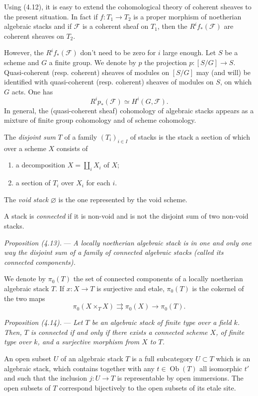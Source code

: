 \documentclass[10pt]{article}
\begin{document}
Using (4.12), it is easy to extend the cohomological theory of coherent sheaves to the present situation. In fact if $f:T_1\to T_2$ is a proper morphism of noetherian algebraic stacks and if $\mathscr F$ is a coherent sheaf on $T_1$, then the $R^i f_*(\mathscr F)$ are coherent sheaves on $T_2$.

However, the $R^if_*(\mathscr F)$ don't need to be zero for $i$ large enough. Let $S$ be a scheme and $G$ a finite group. We denote by $p$ the projection $p:[S/G]\to S$. Quasi-coherent (resp. coherent) sheaves of modules on $[S/G]$ may (and will) be identified with quasi-coherent (resp. coherent) sheaves of modules on $S$, on which $G$ acts. One has
\[
R^i p_*(\mathscr F)\simeq H^i(G,\mathscr F).
\]
In general, the (quasi-coherent sheaf) cohomology of algebraic stacks appears as a mixture of finite group cohomology and of scheme cohomology.

The \emph{disjoint sum} $T$ of a family $(T_i)_{i\in I}$ of stacks is the stack a section of which over a scheme $X$ consists of
\begin{enumerate}[label=(\roman*)]
\item a decomposition $X=\coprod_i X_i$ of $X$;
\item a section of $T_i$ over $X_i$ for each $i$.
\end{enumerate}

The \emph{void stack} $\varnothing$ is the one represented by the void scheme.

A stack is \emph{connected} if it is non-void and is not the disjoint sum of two non-void stacks.

\medskip
\noindent\emph{Proposition (4.13).} --- \emph{A locally noetherian algebraic stack is in one and only one way the disjoint sum of a family of connected algebraic stacks (called its connected components).}

We denote by $\pi_0(T)$ the set of connected components of a locally noetherian algebraic stack $T$. If $x:X\to T$ is surjective and etale, $\pi_0(T)$ is the cokernel of the two maps
\[
\pi_0(X\times_T X)\rightrightarrows \pi_0(X)\longrightarrow \pi_0(T).
\]

\medskip
\noindent\emph{Proposition (4.14).} --- \emph{Let $T$ be an algebraic stack of finite type over a field $k$. Then, $T$ is connected if and only if there exists a connected scheme $X$, of finite type over $k$, and a surjective morphism from $X$ to $T$.}

An open subset $U$ of an algebraic stack $T$ is a full subcategory $U\subset T$ which is an algebraic stack, which contains together with any $t\in\operatorname{Ob}(T)$ all isomorphic $t'$ and such that the inclusion $j:U\to T$ is representable by open immersions. The open subsets of $T$ correspond bijectively to the open subsets of its etale site.
\end{document}
